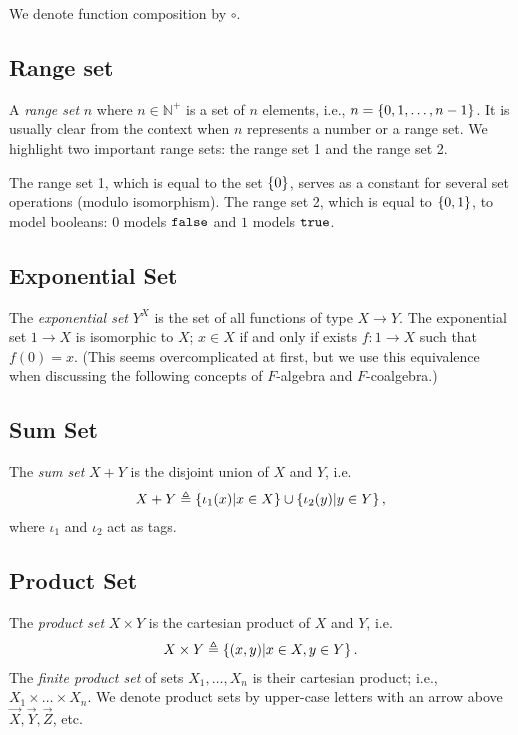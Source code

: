 We denote function composition by $\circ$.

\subsection{Range set}
A \emph{range set} $n$ where $n\in \mathbb{N}^+$ is a set of $n$ elements, i.e., $n=\left\{0,1, \ldots, n-1\right\}$. It is usually clear from the context when $n$ represents a number or a range set. We highlight two important range sets: the range set 1 and the range set 2.

The range set 1, which is equal to the set $\left\{0\right\}$, serves as a constant for several set operations (modulo isomorphism).
The range set 2, which is equal to $\left\{0,1\right\}$, to model booleans: 0 models $\mathtt{\texttt{false}}$ and $1$ models $\mathtt{\texttt{true}}$. 

\subsection{Exponential Set}
The \emph{exponential set} $Y^X$ is the set of all functions of type $X\rightarrow Y$. The exponential set $1\rightarrow X$ is isomorphic to $X$; $x\in X$ if and only if exists $f\colon 1\rightarrow X$ such that $f(0)=x$. (This seems overcomplicated at first, but we use this equivalence when discussing the following concepts of $F$-algebra and $F$-coalgebra.)

\subsection{Sum Set}
The \emph{sum set} $X + Y$ is the disjoint union of $X$ and $Y$, i.e. 
\begin{align*}
    X + Y\triangleq\left\{ \iota_1(x) |x\in X\right\} \cup \left\{\iota_2(y) | y\in Y\right\},
\end{align*}
where $\iota_1$ and $\iota_2$ act as tags.
\subsection{Product Set}
The \emph{product set} $X\times Y$ is the cartesian product of $X$ and $Y$, i.e. 
\begin{align*}
    X\times Y\triangleq\left\{(x,y)|x\in X, y\in Y\right\}.
\end{align*}
The \emph{finite product set} of sets $X_1, \ldots, X_n$ is their cartesian product; i.e., $X_1\times \ldots \times X_n$. We denote product sets by upper-case letters with an arrow above $\vec{X},\vec{Y}, \vec{Z}$, etc.
